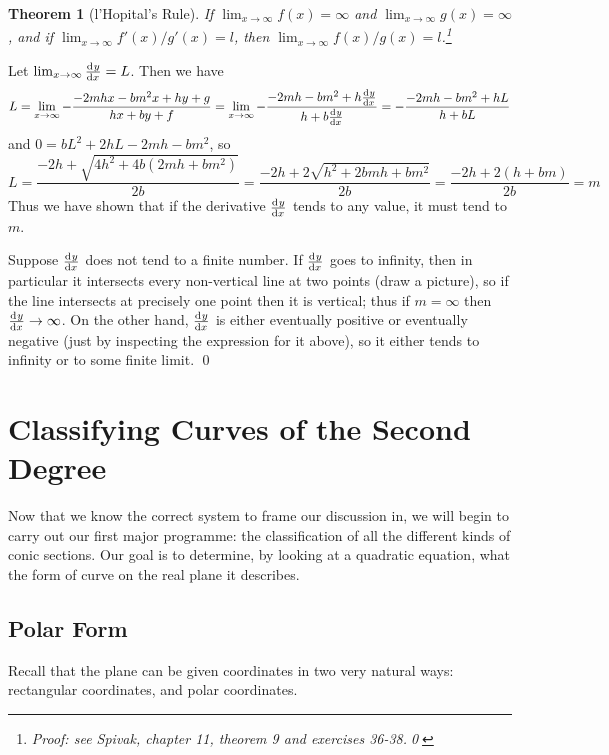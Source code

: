 \documentclass[a4paper,leqno]{article}
\numberwithin{equation}{section}
\newtheorem{thm}[equation]{Theorem}
\theoremstyle{definition}
\theoremstyle{remark}
\begin{document}
\begin{thm}[l'Hopital's Rule]
  If $ \lim_{x \to \infty} f(x) = \infty $ and $ \lim_{x \to \infty} g(x) = \infty $, and if $ \lim_{x\to\infty} f'(x)/g'(x) = l $,
  then $ \lim_{x\to\infty} f(x)/g(x) = l $.\footnote{Proof: see Spivak, chapter 11, theorem 9 and exercises 36-38.\qed}
\end{thm}

Let $ \lim_{x \to \infty} \od{y}{x} = L $. Then we have
\begin{displaymath}
  L = \lim_{x \to \infty} -\frac{-2mhx - bm^2x + hy + g}{hx + by + f} = \lim_{x \to \infty} -\frac{-2mh - bm^2 + h\od{y}{x}}{h + b\od{y}{x}}
                                                                      = -\frac{-2mh - bm^2 + hL}{h + bL}
\end{displaymath}
and $ 0 = bL^2 + 2hL - 2mh - bm^2 $, so
\begin{displaymath}
  L = \frac{-2h + \sqrt{4h^2 + 4b(2mh + bm^2)}}{2b} = \frac{-2h + 2\sqrt{h^2 + 2bmh + bm^2}}{2b}
                                                    = \frac{-2h + 2(h + bm)}{2b} = m
\end{displaymath}
Thus we have shown that if the derivative $ \od{y}{x} $ tends to any value, it must tend to $ m $.

Suppose $ \od{y}{x} $ does not tend to a finite number. If $ \od{y}{x} $ goes to infinity, then in
particular it intersects every non-vertical line at two points (draw a picture), so if the line intersects
at precisely one point then it is vertical; thus if $ m = \infty $ then $ \od{y}{x} \to \infty $. On
the other hand, $ \od{y}{x} $ is either eventually positive or eventually negative (just by inspecting
the expression for it above), so it either tends to infinity or to some finite limit.
\qed

\section{Classifying Curves of the Second Degree}
Now that we know the correct system to frame our discussion in, we will begin to carry out our first major programme: the
classification of all the different kinds of conic sections. Our goal is to determine, by looking at a quadratic equation,
what the form of curve on the real plane it describes.

\subsection{Polar Form}
Recall that the plane can be given coordinates in two very natural ways: rectangular coordinates, and polar coordinates.
\end{document}

